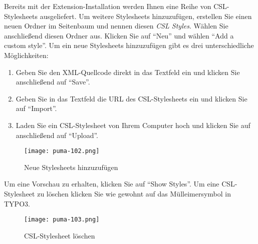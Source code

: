 \documentclass[b5paper,11pt,twoside]{scrbook} %
\begin{document}
Bereits mit der Extension-Installation werden Ihnen eine Reihe von CSL-Stylesheets ausgeliefert. Um weitere Stylesheets hinzuzufügen, erstellen Sie einen neuen Ordner im Seitenbaum und nennen diesen \textit{CSL Styles}. Wählen Sie anschließend diesen Ordner aus. Klicken Sie auf \enquote{Neu} und wählen \enquote{Add a custom style}.\newline \newline
Um ein neue Stylesheets hinzuzufügen gibt es drei unterschiedliche Möglichkeiten:
\begin{enumerate}
\item Geben Sie den XML-Quellcode direkt in das Textfeld ein und klicken Sie anschließend auf \enquote{Save}.
\item Geben Sie in das Textfeld die URL des CSL-Stylesheets ein und klicken Sie auf \enquote{Import}.
\item Laden Sie ein CSL-Stylesheet von Ihrem Computer hoch und klicken Sie auf anschließend auf \enquote{Upload}. 
\end{enumerate}
\begin{figure}[ht]
 \centering
 \texttt{[image: puma-102.png]}
 \caption{Neue Stylesheets hinzuzufügen}
 \label{figure1}
\end{figure}
Um eine Vorschau zu erhalten, klicken Sie auf \enquote{Show Styles}.\newline
Um eine CSL-Stylesheet zu löschen klicken Sie wie gewohnt auf das Mülleimersymbol in TYPO3. 
\begin{figure}[ht]
 \centering
 \texttt{[image: puma-103.png]}
 \caption{CSL-Stylesheet löschen}
 \label{figure1}
\end{figure}
\end{document}
